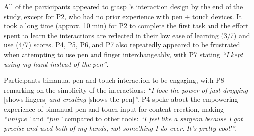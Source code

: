 




\vspace{2mm}
All of the participants appeared to grasp \toolname{}'s interaction design by the end of the study, except for P2, who had no prior experience with pen + touch devices. It took a long time (approx. 10 min) for P2 to complete the first task and the effort spent to learn the interactions are reflected in their low ease of learning (3/7) and use (4/7) scores. P4, P5, P6, and P7 also repeatedly appeared to be frustrated when attempting to use pen and finger interchangeably, with P7 stating \textit{``I kept using my hand instead of the pen''}.


Participants bimanual pen and touch interaction to be engaging, with P8 remarking on the simplicity of the interactions: \textit{``I love the power of just dragging} [shows fingers] \textit{and creating} [shows the pen]\textit{''}. P4 spoke about the empowering experience of bimanual pen and touch input for content creation, making \toolname{} \textit{``unique''} and \textit{``fun''} compared to other tools: \textit{``I feel like a surgeon because I got precise and used both of my hands, not something I do ever. It's pretty cool!''}.


